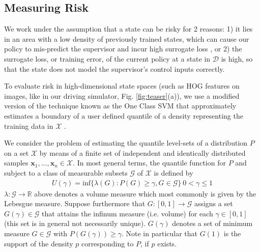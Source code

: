 \documentclass[10pt, conference]{ieeeconf}      %
\newcommand{\fpnote}[1]{\ifthenelse{ \boolean{include-notes}}%
 {\textcolor{blue}{\textbf{FP: #1}}}{}}
\begin{document}
\subsection{Measuring Risk}
We work under the assumption that a state can be risky for 2 reasons: 1) it lies in an area with a low density of
previously trained states, which can cause our policy to mis-predict the supervisor and incur high surrogate
loss \cite{tokdar2010importance}, or 2) the surrogate loss, or training error, of the current policy at a state in $\mathcal{D}$ is high, so that the state does not model the supervisor's control inputs correctly. 


To evaluate risk in high-dimensional state spaces (such as HOG features on images, like in our driving simulator, Fig. \ref{fig:teaser}(a)), we use
a modified version of the technique known as the One Class SVM that  approximately estimates a boundary of a user defined quantile of
a density representing the training data in $\mathcal{X}$ \cite{scholkopf2001estimating}.


We consider the problem of estimating the quantile level-sets of a distribution $P$ on a set $\mathcal{X}$ by means of a finite set of
independent and identically distributed samples $\mathbf{x}_1,...,\mathbf{x}_n\in \mathcal{X}$.
In most general terms, the quantile function for $P$ and subject to a class of measurable subsets $\mathcal{G}$ of $\mathcal{X}$ is
defined by
\begin{align}\label{eq:quantile}
U(\gamma) = \mbox{inf} \lbrace \lambda(G):P(G) \geq \gamma, G \in \mathcal{G} \rbrace \: 0<\gamma \leq 1
\end{align} 
$\lambda:\mathcal{G}\to \mathbb{R}$ above denotes a volume measure which most commonly is given by the Lebesgue measure.
Suppose furthermore that $G:[0,1]\to \mathcal{G}$ assigns a set $G(\gamma) \in \mathcal{G}$ that attains the infinum
measure (i.e. volume) for each $\gamma\in [0,1]$ (this set is in general not necessarily unique). 
$G(\gamma)$ denotes a set of minimum measure $G \in \mathcal{G}$ with $P(G(\gamma))\ge \gamma$. Note in particular that $G(1)$ is the support of the density $p$ corresponding to $P$, if $p$ exists. 
\end{document}
